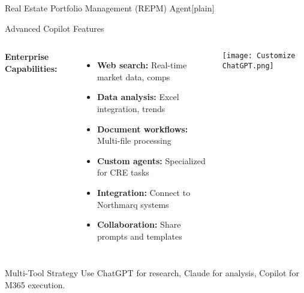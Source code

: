 \documentclass{beamer}
\begin{document}
{%
    \begin{frame}{Real Estate Portfolio Management (REPM) Agent}[plain]
     \end{frame}
}

\begin{frame}{Advanced Copilot Features}
  \begin{columns}
      \textbf{Enterprise Capabilities:}
      \begin{itemize}
        \item \textbf{Web search:} Real-time market data, comps
        \item \textbf{Data analysis:} Excel integration, trends
        \item \textbf{Document workflows:} Multi-file processing
        \item \textbf{Custom agents:} Specialized for CRE tasks
        \item \textbf{Integration:} Connect to Northmarq systems
        \item \textbf{Collaboration:} Share prompts and templates
      \end{itemize}
      \centering
      \texttt{[image: Customize ChatGPT.png]}
  \end{columns}

  \begin{block}{Multi-Tool Strategy}
    Use ChatGPT for research, Claude for analysis, Copilot for M365 execution.
  \end{block}
\end{frame}
\end{document}
